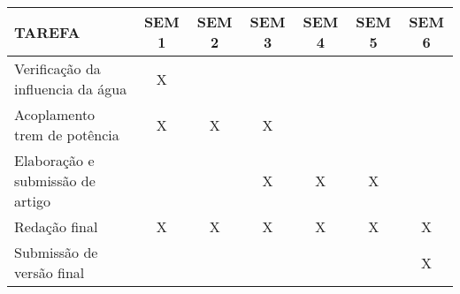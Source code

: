     \begin{tabular}{l c c c c c c}
        \hline TAREFA & SEM 1 & SEM 2 & SEM 3 & SEM 4 & SEM 5 & SEM 6\\
        \hline        
		Verificação da influencia da água & X & & & & & \\
		Acoplamento trem de potência & X & X & X & & & \\
		Elaboração e submissão de artigo & & & X & X & X &\\
		Redação final & X& X& X& X & X & X\\
		Submissão de versão final & & & & & & X \\
		\hline
    \end{tabular}
